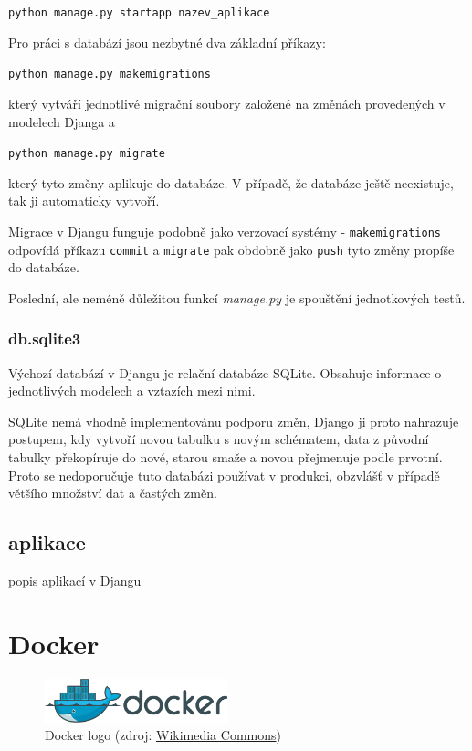 \begin{center}
\texttt{python manage.py startapp nazev\_aplikace}
\end{center}

Pro práci s databází jsou nezbytné dva základní příkazy:

\begin{center}
\texttt{python manage.py makemigrations}
\end{center}

který vytváří jednotlivé migrační soubory založené na změnách provedených v modelech Djanga a 

\begin{center}
\texttt{python manage.py migrate}
\end{center}

který tyto změny aplikuje do databáze. V případě, že databáze ještě neexistuje, tak ji automaticky vytvoří.

Migrace v Djangu funguje podobně jako verzovací systémy - \texttt{makemigrations} odpovídá příkazu \texttt{commit} a \texttt{migrate} pak obdobně jako \texttt{push} tyto změny propíše do databáze.

Poslední, ale neméně důležitou funkcí \textit{manage.py} je spouštění jednotkových testů.

\subsubsection{db.sqlite3}
Výchozí databází v Djangu je relační databáze SQLite. Obsahuje informace o jednotlivých modelech a vztazích mezi nimi.

SQLite nemá vhodně implementovánu podporu změn, Django ji proto nahrazuje postupem, kdy vytvoří novou tabulku s novým schématem, data z původní tabulky překopíruje do nové, starou smaže a novou přejmenuje podle prvotní. Proto se nedoporučuje tuto databázi používat v produkci, obzvlášť v případě většího množství dat a častých změn.

\subsection{aplikace}
popis aplikací v Djangu

\section{Docker}

\begin{figure}[H] \centering
      \includegraphics[width=150pt]{./pictures/Docker_(container_engine)_logo.png}
      \caption[Docker logo]{Docker logo (zdroj:
\href{https://commons.wikimedia.org/wiki/File:Docker_(container_engine)_logo.png}{Wikimedia Commons})}
      \label{fig:docker}
  \end{figure}

